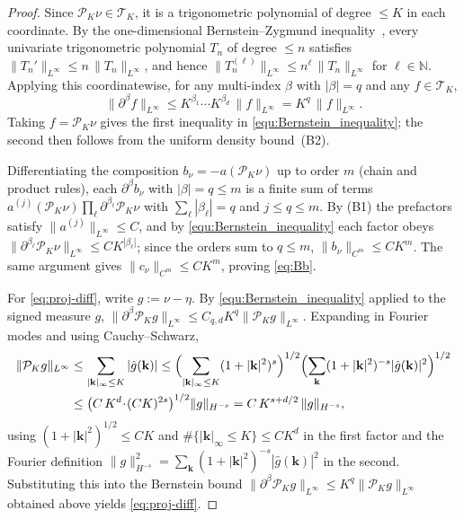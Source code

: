 \documentclass[a4paper,fleqn]{cas-sc}
\theoremstyle{definition}
\theoremstyle{remark}
\begin{document}
\begin{proof}
Since $\mathcal P_K\nu\in\mathcal T_K$,
it is a trigonometric polynomial of degree $\le K$ in each coordinate. By the
one-dimensional Bernstein--Zygmund inequality~\cite[Theorem~3.13,
Chapter~X]{zygmund2002trigonometric}, every univariate trigonometric polynomial
$T_n$ of degree $\le n$ satisfies $\|T_n'\|_{L^\infty}\le n\,\|T_n\|_{L^\infty}$,
and hence $\|T_n^{(\ell)}\|_{L^\infty}\le n^{\ell}\,\|T_n\|_{L^\infty}$ for
$\ell\in\mathbb N$. Applying this coordinatewise, for any multi-index $\beta$ with
$|\beta|=q$ and any $f\in\mathcal T_K$,
\[
\|\partial^\beta f\|_{L^\infty}
\le K^{\beta_1}\cdots K^{\beta_d}\,\|f\|_{L^\infty}
=K^{q}\,\|f\|_{L^\infty}.
\]
Taking $f=\mathcal P_K\nu$ gives the first inequality in
\eqref{equ:Bernstein_inequality}; the second then follows from the uniform
density bound~(B2).

Differentiating the composition $b_\nu=-a(\mathcal P_K\nu)$ up to order $m$ (chain
and product rules), each $\partial^\beta b_\nu$ with $|\beta|=q\le m$ is a finite
sum of terms $a^{(j)}(\mathcal P_K\nu)\prod_\ell\partial^{\beta_\ell}\mathcal P_K\nu$
with $\sum_\ell|\beta_\ell|=q$ and $j\le q\le m$. By (B1) the prefactors satisfy
$\|a^{(j)}\|_{L^\infty}\le C$, and by \eqref{equ:Bernstein_inequality} each factor
obeys $\|\partial^{\beta_\ell}\mathcal P_K\nu\|_{L^\infty}\le CK^{|\beta_\ell|}$;
since the orders sum to $q\le m$, $\|b_\nu\|_{C^m}\le CK^m$. The same argument
gives $\|c_\nu\|_{C^m}\le CK^m$, proving \eqref{eq:Bb}.

For \eqref{eq:proj-diff}, write $g:=\nu-\eta$. By
\eqref{equ:Bernstein_inequality} applied to the signed measure $g$,
$\|\partial^\beta\mathcal P_K g\|_{L^\infty}\le C_{q,d}K^{q}\|\mathcal P_K g\|_{L^\infty}$.
Expanding in Fourier modes and using Cauchy--Schwarz,
\[
\begin{aligned}
\|\mathcal P_K g\|_{L^\infty}
&\le\sum_{|\mathbf k|_\infty\le K}|\hat g(\mathbf k)|
\le\Bigl(\sum_{|\mathbf k|_\infty\le K}(1+|\mathbf k|^2)^{s}\Bigr)^{1/2}
   \Bigl(\sum_{\mathbf k}(1+|\mathbf k|^2)^{-s}|\hat g(\mathbf k)|^2\Bigr)^{1/2}\\
&\le\bigl(C\,K^d\!\cdot\!(CK)^{2s}\bigr)^{1/2}\|g\|_{H^{-s}}
=C\,K^{s+d/2}\,\|g\|_{H^{-s}},
\end{aligned}
\]
using $(1+|\mathbf k|^2)^{1/2}\le CK$ and $\#\{|\mathbf k|_\infty\le K\}\le CK^d$
in the first factor and the Fourier definition
$\|g\|_{H^{-s}}^2=\sum_{\mathbf k}(1+|\mathbf k|^2)^{-s}|\hat g(\mathbf k)|^2$ in
the second. Substituting this into the Bernstein bound
$\|\partial^\beta\mathcal P_K g\|_{L^\infty}\le K^{q}\|\mathcal P_K g\|_{L^\infty}$
obtained above yields \eqref{eq:proj-diff}.


\end{proof}
\end{document}
